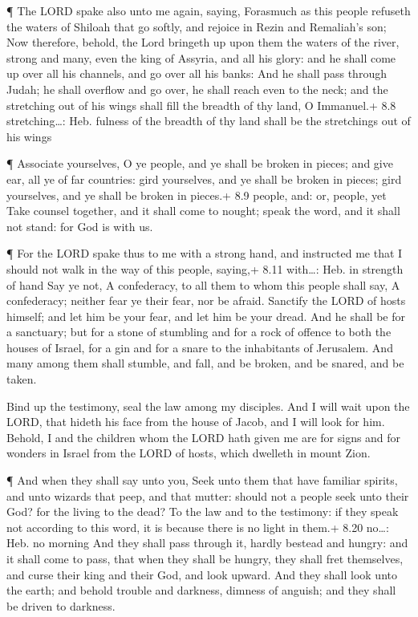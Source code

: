  ¶ The LORD spake also unto me again, saying, 
Forasmuch as this people refuseth the waters of Shiloah that go softly,
and rejoice in Rezin and Remaliah's son;  Now therefore,
behold, the Lord bringeth up upon them the waters of the river, strong
and many, even the king of Assyria, and all his glory: and he shall come
up over all his channels, and go over all his banks:  And he
shall pass through Judah; he shall overflow and go over, he shall reach
even to the neck; and the stretching out of his wings shall fill the
breadth of thy land, O Immanuel.+ 8.8 stretching\ldots: Heb. fulness of
the breadth of thy land shall be the stretchings out of his wings

 ¶ Associate yourselves, O ye people, and ye shall be broken
in pieces; and give ear, all ye of far countries: gird yourselves, and
ye shall be broken in pieces; gird yourselves, and ye shall be broken in
pieces.+ 8.9 people, and: or, people, yet  Take counsel
together, and it shall come to nought; speak the word, and it shall not
stand: for God is with us.

 ¶ For the LORD spake thus to me with a strong hand, and
instructed me that I should not walk in the way of this people, saying,+
8.11 with\ldots: Heb. in strength of hand  Say ye not, A
confederacy, to all them to whom this people shall say, A confederacy;
neither fear ye their fear, nor be afraid.  Sanctify the
LORD of hosts himself; and let him be your fear, and let him be your
dread.  And he shall be for a sanctuary; but for a stone of
stumbling and for a rock of offence to both the houses of Israel, for a
gin and for a snare to the inhabitants of Jerusalem.  And
many among them shall stumble, and fall, and be broken, and be snared,
and be taken.

 Bind up the testimony, seal the law among my disciples.
 And I will wait upon the LORD, that hideth his face from
the house of Jacob, and I will look for him.  Behold, I and
the children whom the LORD hath given me are for signs and for wonders
in Israel from the LORD of hosts, which dwelleth in mount Zion.

 ¶ And when they shall say unto you, Seek unto them that
have familiar spirits, and unto wizards that peep, and that mutter:
should not a people seek unto their God? for the living to the dead?
 To the law and to the testimony: if they speak not
according to this word, it is because there is no light in them.+ 8.20
no\ldots: Heb. no morning  And they shall pass through it,
hardly bestead and hungry: and it shall come to pass, that when they
shall be hungry, they shall fret themselves, and curse their king and
their God, and look upward.  And they shall look unto the
earth; and behold trouble and darkness, dimness of anguish; and they
shall be driven to darkness.

